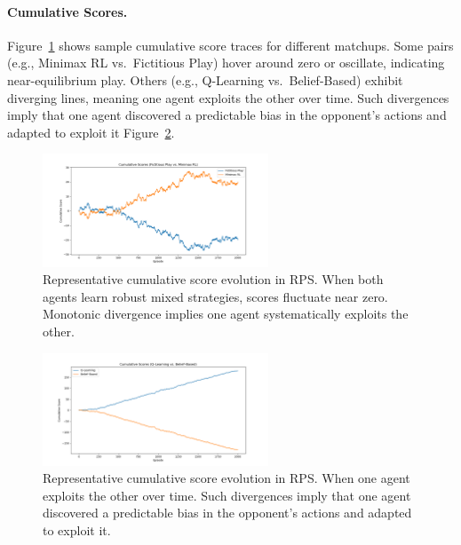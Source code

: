 \documentclass[11pt]{article}
\begin{document}
\paragraph{Cumulative Scores.}
Figure~\ref{fig:rps-fp-mm-cumulative} shows sample cumulative score traces 
for different matchups. Some pairs (e.g., Minimax RL vs.\ Fictitious Play) 
hover around zero or oscillate, indicating near-equilibrium play. Others 
(e.g., Q-Learning vs.\ Belief-Based) exhibit diverging lines, meaning one 
agent exploits the other over time. Such divergences imply that one 
agent discovered a predictable bias in the opponent's actions and 
adapted to exploit it Figure~\ref{fig:rps-ql-bb-cumulative}.

\begin{figure}[htbp]
    \centering
    \includegraphics[width=0.6\textwidth]{rps-plots/fp_vs_mm_cumulative.png}
    \caption{Representative cumulative score evolution in RPS. When both 
    agents learn robust mixed strategies, scores fluctuate near zero. 
    Monotonic divergence implies one agent systematically exploits the other.}
    \label{fig:rps-fp-mm-cumulative}
\end{figure}

\begin{figure}[htbp]
    \centering
    \includegraphics[width=0.6\textwidth]{rps-plots/ql_vs_bp_cumulative.png}
    \caption{Representative cumulative score evolution in RPS. When one 
    agent exploits the other over time. Such divergences imply that one 
    agent discovered a predictable bias in the opponent's actions and 
    adapted to exploit it.}
    \label{fig:rps-ql-bb-cumulative}
\end{figure}
\end{document}
